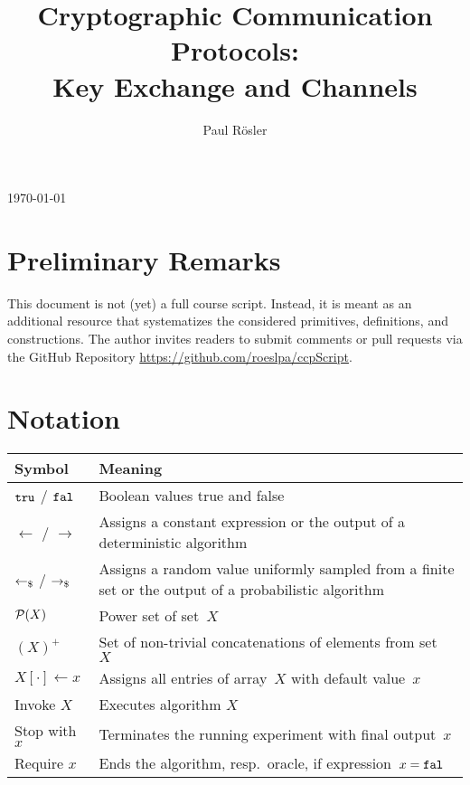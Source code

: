 \documentclass[a4paper,orivec]{llncs}
\title{Cryptographic Communication Protocols:\\Key Exchange and Channels}
\author{Paul Rösler}
\institute{FAU Erlangen-Nürnberg}
\begin{document}
\maketitle
\begin{center}
    \today
\end{center}

\begingroup
\let\clearpage\relax
\tableofcontents
\endgroup




\section{Preliminary Remarks}
This document is not (yet) a full course script.
Instead, it is meant as an additional resource that systematizes the considered primitives, definitions, and constructions.
The author invites readers to submit comments or pull requests via the GitHub Repository \url{https://github.com/roeslpa/ccpScript}.


\section{Notation}

\begin{tabular}{|l|p{13cm}|}\hline
    \textbf{Symbol} & \textbf{Meaning}\\\hline
    $\mathtt{tru}$ / $\mathtt{fal}$ & Boolean values true and false\\
    $\gets$ / $\to$ & Assigns a constant expression or the output of a deterministic algorithm\\
    $\getsr$ / $\tor$ & Assigns a random value uniformly sampled from a finite set or the output of a probabilistic algorithm\\
    $\mathcal{P}(X)$ & Power set of set~$X$\\
    $(X)^+$ & Set of non-trivial concatenations of elements from set~$X$\\
    $X[\cdot]\gets x$ & Assigns all entries of array~$X$ with default value~$x$\\
    Invoke $X$ & Executes algorithm $X$\\
    Stop with $x$ & Terminates the running experiment with final output~$x$\\
    Require $x$ & Ends the algorithm, resp.~oracle, if expression~$x=\mathtt{fal}$\\\hline
\end{tabular}



\end{document}
